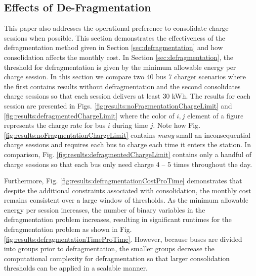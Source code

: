 \subsection{Effects of De-Fragmentation}
This paper also addresses the operational preference to consolidate charge sessions when possible. This section demonstrates the effectiveness of the defragmentation method given in Section \ref{sec:defragmentation} and how consolidation affects the monthly cost. In Section \ref{sec:defragmentation}, the threshold for defragmentation is given by the minimum allowable energy per charge session. In this section we compare two 40 bus 7 charger scenarios where the first contains results without defragmentation and the second consolidates charge sessions so that each session delivers at least 30 kWh. The results for each session are presented in Figs. \ref{fig:results:noFragmentationChargeLimit} and \ref{fig:results:defragmentedChargeLimit} where the color of $i,j$ element of a figure represents the charge rate for bus $i$ during time $j$. Note how Fig. \ref{fig:results:noFragmentationChargeLimit} contains {\it many} small an inconsequential charge sessions and requires each bus to charge each time it enters the station. In comparison, Fig. \ref{fig:results:defragmentedChargeLimit} contains only a handful of charge sessions so that each bus only need charge 4 -- 5 times throughout the day.  
\par Furthermore, Fig. \ref{fig:results:defragmentationCostProTime} demonstrates that despite the additional constraints associated with consolidation, the monthly cost remains consistent over a large window of thresholds. As the minimum allowable energy per session increases, the number of binary variables in the defragmentation problem increases, resulting in significant runtimes for the defragmentation problem as shown in Fig. \ref{fig:results:defragmentationTimeProTime}. However, because buses are divided into groups prior to defragmentation, the smaller groups decrease the computational complexity for defragmentation so that larger consolidation thresholds can be applied in a scalable manner. 

 


